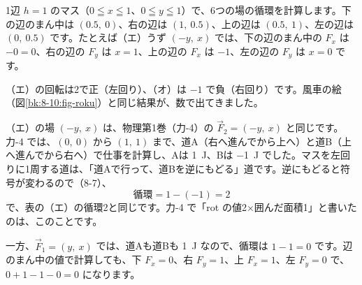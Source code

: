 1辺 $h=1$ のマス（$0\leqq x\leqq1$、$0\leqq y\leqq1$）で、6つの場の循環を計算します。下の辺のまん中は $(0.5,\ 0)$、右の辺は $(1,\ 0.5)$、上の辺は $(0.5,\ 1)$、左の辺は $(0,\ 0.5)$ です。たとえば（エ）うず $(-y,\ x)$ では、下の辺のまん中の $F_x$ は $-0=0$、右の辺の $F_y$ は $x=1$、上の辺の $F_x$ は $-1$、左の辺の $F_y$ は $x=0$ です。
\begin{bkcenter}
\end{bkcenter}
（エ）の回転は2で正（左回り）、（オ）は $-1$ で負（右回り）です。風車の絵（図\ref{bk:8-10:fig-roku}）と同じ結果が、数で出てきました。

（エ）の場 $(-y,\ x)$ は、物理第1巻（力-4）の $\vec F_2=(-y,\ x)$ と同じです。力-4 では、$(0,\ 0)$ から $(1,\ 1)$ まで、道A（右へ進んでから上へ）と道B（上へ進んでから右へ）で仕事を計算し、Aは \qty{1}{J}、Bは \qty{-1}{J} でした。マスを左回りに1周する道は、「道Aで行って、道Bを逆にもどる」道です。逆にもどると符号が変わるので（8-7）、
\[ \text{循環}=1-(-1)=2 \]
で、表の（エ）の循環2と同じです。力-4 で「rot の値2×囲んだ面積1」と書いたのは、このことです。\par
\noindent 一方、$\vec F_1=(y,\ x)$ では、道Aも道Bも \qty{1}{J} なので、循環は $1-1=0$ です。辺のまん中の値で計算しても、下 $F_x=0$、右 $F_y=1$、上 $F_x=1$、左 $F_y=0$ で、$0+1-1-0=0$ になります。

